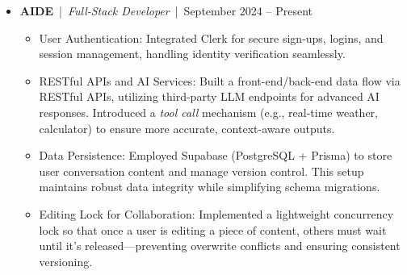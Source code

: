 \documentclass[11pt]{article}
\begin{document}
\begin{itemize}[leftmargin=0pt, label={}, itemsep=0pt,
  topsep=0pt,
  parsep=0pt,
  partopsep=0pt]  %
  \item 
    \textbf{AIDE} \,|\, \textit{Full-Stack Developer } \,|\, 
 September 2024 -- Present
    \begin{itemize}[label=\textbullet, leftmargin=1.5em, itemsep=0pt, topsep=0pt, parsep=0pt, partopsep=0pt]
    \item {User Authentication:} Integrated Clerk for secure sign-ups, logins, and session management, handling identity verification seamlessly.
  \item {RESTful APIs and AI Services:} Built a front-end/back-end data flow via RESTful APIs, utilizing third-party LLM endpoints for advanced AI responses. Introduced a \emph{tool call} mechanism (e.g., real-time weather, calculator) to ensure more accurate, context-aware outputs.
  \item {Data Persistence:} Employed Supabase (PostgreSQL + Prisma) to store user conversation content and manage version control. This setup maintains robust data integrity while simplifying schema migrations.
  \item {Editing Lock for Collaboration:} Implemented a lightweight concurrency lock so that once a user is editing a piece of content, others must wait until it’s released—preventing overwrite conflicts and ensuring consistent versioning.
\end{itemize}
\end{itemize}
\end{document}
